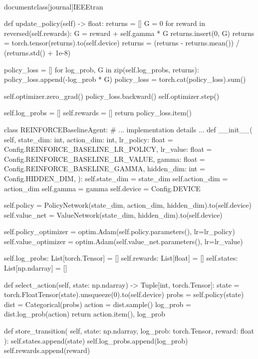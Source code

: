 \\documentclass[journal]{IEEEtran}
\begin{document}
    def update_policy(self) -> float:
        returns = []
        G = 0
        for reward in reversed(self.rewards):
            G = reward + self.gamma * G
            returns.insert(0, G)
        returns = torch.tensor(returns).to(self.device)
        returns = (returns - returns.mean()) / (returns.std() + 1e-8)

        policy_loss = []
        for log_prob, G in zip(self.log_probs, returns):
            policy_loss.append(-log_prob * G)
        policy_loss = torch.cat(policy_loss).sum()

        self.optimizer.zero_grad()
        policy_loss.backward()
        self.optimizer.step()

        self.log_probs = []
        self.rewards = []
        return policy_loss.item()

class REINFORCEBaselineAgent:
    # ... implementation details ...
    def __init__(
        self,
        state_dim: int,
        action_dim: int,
        lr_policy: float = Config.REINFORCE_BASELINE_LR_POLICY,
        lr_value: float = Config.REINFORCE_BASELINE_LR_VALUE,
        gamma: float = Config.REINFORCE_BASELINE_GAMMA,
        hidden_dim: int = Config.HIDDEN_DIM,
    ):
        self.state_dim = state_dim
        self.action_dim = action_dim
        self.gamma = gamma
        self.device = Config.DEVICE

        self.policy = PolicyNetwork(state_dim, action_dim, hidden_dim).to(self.device)
        self.value_net = ValueNetwork(state_dim, hidden_dim).to(self.device)

        self.policy_optimizer = optim.Adam(self.policy.parameters(), lr=lr_policy)
        self.value_optimizer = optim.Adam(self.value_net.parameters(), lr=lr_value)

        self.log_probs: List[torch.Tensor] = []
        self.rewards: List[float] = []
        self.states: List[np.ndarray] = []

    def select_action(self, state: np.ndarray) -> Tuple[int, torch.Tensor]:
        state = torch.FloatTensor(state).unsqueeze(0).to(self.device)
        probs = self.policy(state)
        dist = Categorical(probs)
        action = dist.sample()
        log_prob = dist.log_prob(action)
        return action.item(), log_prob

    def store_transition(
        self, state: np.ndarray, log_prob: torch.Tensor, reward: float
    ):
        self.states.append(state)
        self.log_probs.append(log_prob)
        self.rewards.append(reward)
\end{document}
